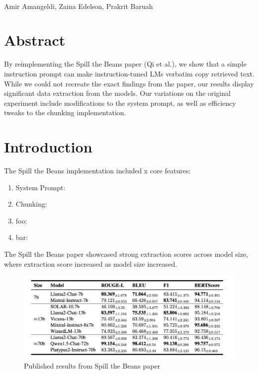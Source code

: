\documentclass[10pt,letterpaper]{article}
\begin{document}
\vspace*{0.35in}

\begin{flushleft}
{\Large
\textbf{}
}
\newline
\\
Amir Amangeldi,
Zaina Edelson,
Prakrit Baruah

\end{flushleft}

\section*{Abstract}
By reimplementing the Spill the Beans paper (Qi et al.), we show that a simple instruction prompt can make instruction-tuned LMs verbatim copy retrieved text. While we could not recreate the exact findings from the paper, our results display significant data extraction from the models. Our variations on the original experiment include modifications to the system prompt, as well as efficiency tweaks to the chunking implementation.

\linenumbers

\section*{Introduction}
The Spill the Beans implementation included {x} core features:
\begin{enumerate}
    \item System Prompt:
    \item Chunking:
    \item foo:
    \item bar:
\end{enumerate}


The Spill the Beans paper showcased strong extraction scores across model size, where extraction score increased as model size increased.
\begin{figure}[ht]
\centering
\includegraphics[width=125mm]{paper_results.png}
\caption{Published results from Spill the Beans paper} %
\end{figure}




\end{document}
